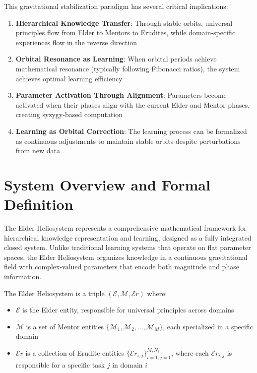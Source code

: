 This gravitational stabilization paradigm has several critical implications:

\begin{enumerate}
    \item \textbf{Hierarchical Knowledge Transfer}: Through stable orbits, universal principles flow from Elder to Mentors to Erudites, while domain-specific experiences flow in the reverse direction
    
    \item \textbf{Orbital Resonance as Learning}: When orbital periods achieve mathematical resonance (typically following Fibonacci ratios), the system achieves optimal learning efficiency
    
    \item \textbf{Parameter Activation Through Alignment}: Parameters become activated when their phases align with the current Elder and Mentor phases, creating syzygy-based computation
    
    \item \textbf{Learning as Orbital Correction}: The learning process can be formalized as continuous adjustments to maintain stable orbits despite perturbations from new data
\end{enumerate}

\section{System Overview and Formal Definition}

The Elder Heliosystem represents a comprehensive mathematical framework for hierarchical knowledge representation and learning, designed as a fully integrated closed system. Unlike traditional learning systems that operate on flat parameter spaces, the Elder Heliosystem organizes knowledge in a continuous gravitational field with complex-valued parameters that encode both magnitude and phase information.

\begin{definition}
The Elder Heliosystem is a triple $(\mathcal{E}, \mathcal{M}, \mathcal{E}r)$ where:
\begin{itemize}
    \item $\mathcal{E}$ is the Elder entity, responsible for universal principles across domains
    \item $\mathcal{M}$ is a set of Mentor entities $\{\mathcal{M}_1, \mathcal{M}_2, \ldots, \mathcal{M}_M\}$, each specialized in a specific domain
    \item $\mathcal{E}r$ is a collection of Erudite entities $\{\mathcal{E}r_{i,j}\}_{i=1,j=1}^{M,N_i}$, where each $\mathcal{E}r_{i,j}$ is responsible for a specific task $j$ in domain $i$
\end{itemize}
\end{definition}

